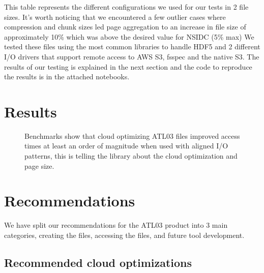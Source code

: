 \documentclass[
]{agujournal2019}
\begin{document}
This table represents the different configurations we used for our tests
in 2 file sizes. It's worth noticing that we encountered a few outlier
cases where compression and chunk sizes led page aggregation to an
increase in file size of approximately 10\% which was above the desired
value for NSIDC (5\% max) We tested these files using the most common
libraries to handle HDF5 and 2 different I/O drivers that support remote
access to AWS S3, fsspec and the native S3. The results of our testing
is explained in the next section and the code to reproduce the results
is in the attached notebooks.

\section{Results}\label{results}

\begin{figure}


\caption{\label{fig-5}Benchmarks show that cloud optimizing ATL03 files
improved access times at least an order of magnitude when used with
aligned I/O patterns, this is telling the library about the cloud
optimization and page size.}

\end{figure}%

\section{Recommendations}\label{recommendations}

We have split our recommendations for the ATL03 product into 3 main
categories, creating the files, accessing the files, and future tool
development.

\subsection{Recommended cloud
optimizations}\label{recommended-cloud-optimizations}
\end{document}
